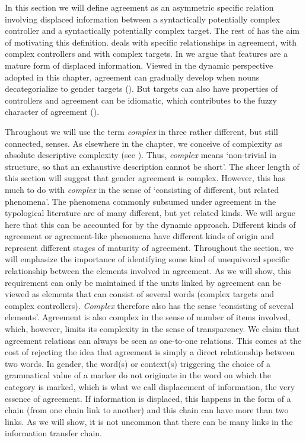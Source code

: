 \documentclass[output=collectionpaper]{langsci/langscibook}
\begin{document}
In this section we will define agreement as an asymmetric specific relation involving displaced information between a syntactically potentially complex controller and a syntactically potentially complex target. The rest of  has the aim of motivating this definition.  deals with specific relationships in agreement,  with complex controllers and  with complex targets. In  we argue that features are a mature form of displaced information. Viewed in the dynamic perspective adopted in this chapter, agreement can gradually develop when nouns decategorialize to gender targets (). But targets can also have properties of controllers and agreement can be idiomatic, which contributes to the fuzzy character of agreement ().

Throughout  we will use the term \textit{complex} in three rather different, but still connected, senses. As elsewhere in the chapter, we conceive of complexity as absolute descriptive complexity (see ). Thus, \textit{complex} means `non-trivial in structure, so that an exhaustive description cannot be short'. The sheer length of this section will suggest that gender agreement is complex. However, this has much to do with \textit{complex} in the sense of `consisting of different, but related phenomena'. The phenomena commonly subsumed under agreement in the typological literature are of many different, but yet related kinds. We will argue here that this can be accounted for by the dynamic approach. Different kinds of agreement or agreement-like phenomena have different kinds of origin and represent different stages of maturity of agreement. Throughout the section, we will emphasize the importance of identifying some kind of unequivocal specific relationship between the elements involved in agreement. As we will show, this requirement can only be maintained if the units linked by agreement can be viewed as elements that can consist of several words (complex targets and complex controllers). \textit{Complex} therefore also has the sense `consisting of several elements'. Agreement is also complex in the sense of number of items involved, which, however, limits its complexity in the sense of transparency. We claim that agreement relations can always be seen as one-to-one relations. This comes at the cost of rejecting the idea that agreement is simply a direct relationship between two words. In gender, the word(s) or context(s) triggering the choice of a grammatical value of a marker do not originate in the word on which the category is marked, which is what we call displacement of information, the very essence of agreement. If information is displaced, this happens in the form of a chain (from one chain link to another) and this chain can have more than two links. As we will show, it is not uncommon that there can be many links in the information transfer chain.
\end{document}
